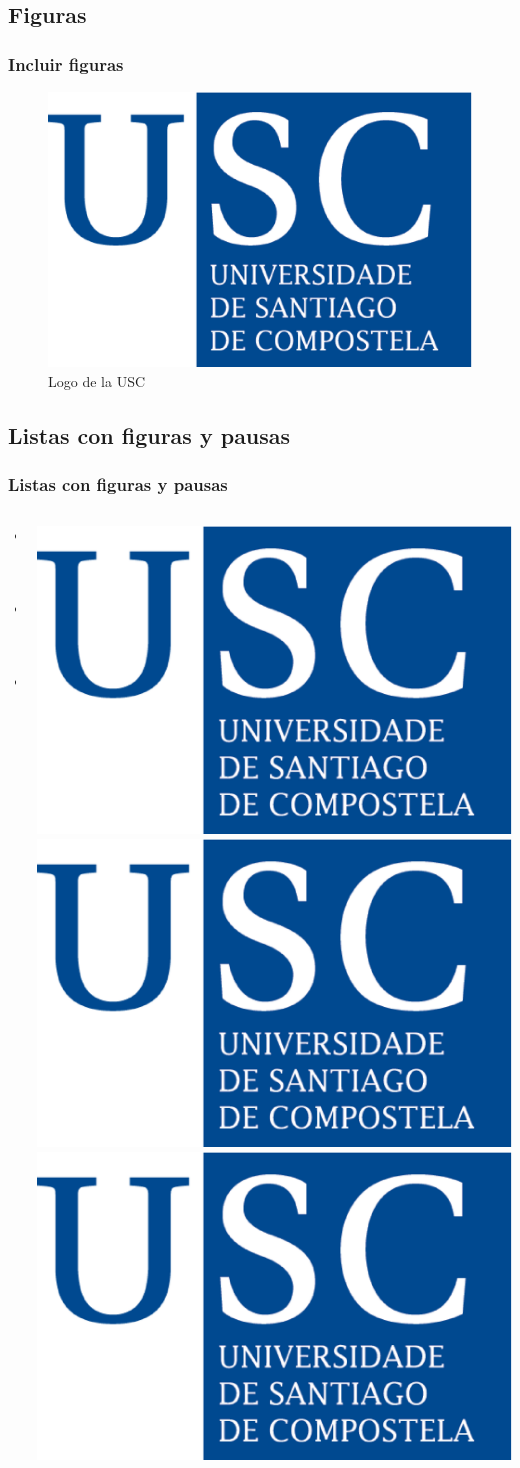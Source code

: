 \documentclass{beamer}
\begin{document}
\subsection{Figuras}
\begin{frame}
    \frametitle{Incluir figuras}
    \begin{figure}
        \includegraphics[scale=0.3]{figuras/logo_usc.eps}
        \caption{Logo de la USC}
    \end{figure}
\end{frame}

\subsection{Listas con figuras y pausas}

\begin{frame}
    \frametitle{Listas con figuras y pausas}
    \begin{columns}
        \begin{column}{4cm}
            \begin{itemize}
                \item<1-> Una
                \item<3-> Dos
                \item<5-> Tres
            \end{itemize}
            \vspace{3cm}
        \end{column}
        \begin{column}{4cm}
            \begin{overprint}
                \includegraphics<2>[scale=0.05]{figuras/logo_usc.eps}
                \includegraphics<4>[scale=0.10]{figuras/logo_usc.eps}
                \includegraphics<6>[scale=0.15]{figuras/logo_usc.eps}
            \end{overprint}
        \end{column}
    \end{columns}
\end{frame}
\end{document}
